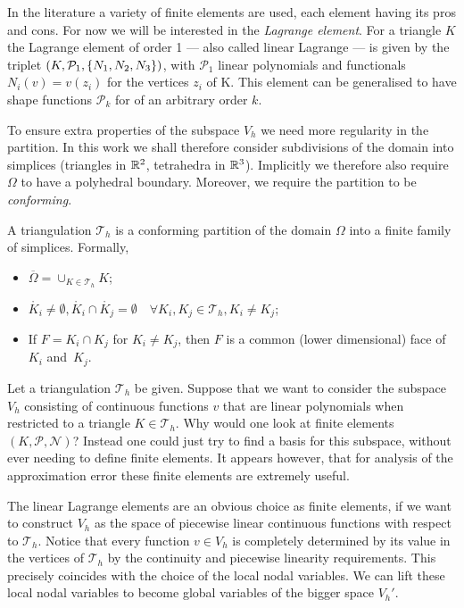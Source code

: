\documentclass[thesis.tex]{subfiles}
\begin{document}
  In the literature a variety of finite elements are used, each element having its pros and cons. For now we will be interested in the \emph{Lagrange element}. For a triangle $K$ the Lagrange element of order 1 --- also called linear Lagrange --- is given by the triplet $(K, \mathcal{P}_1, \set{N_1, N_2, N_3})$, with $\mathcal{P}_1$ linear polynomials and functionals $N_i(v) = v(z_i)$ for the vertices $z_i$ of K. This element can be generalised to have shape functions $\mathcal{P}_k$ for of an arbitrary order $k$.

  To ensure extra properties of the subspace $V_h$ we need more regularity in the partition. In this work  we shall therefore consider subdivisions of the domain into simplices (triangles in $\mathbb{R}^2$, tetrahedra in $\mathbb{R}^3$). Implicitly we therefore also require $\Omega$ to have a polyhedral boundary. Moreover, we require the partition to be \emph{conforming}.
  \begin{defn}
    A triangulation $\mathcal{T}_h$ is a conforming partition of the domain $\Omega$ into a finite family of simplices.
    Formally,
    \begin{itemize}
      \item $\overline{\Omega} = \cup_{K \in \mathcal{T}_h} K$;
      \item $\mathring{K_i} \ne \emptyset, \mathring{K_i} \cap \mathring{K_j} = \emptyset \quad \forall K_i, K_j \in \mathcal{T}_h, K_i \ne K_j$;
    \item If $F = K_i \cap K_j$ for $K_i \ne K_j$, then $F$ is a common (lower dimensional) face of $K_i$ and~$K_j$.
  \end{itemize}
  \end{defn}
  
  Let a triangulation $\mathcal{T}_h$ be given. Suppose that we want to consider the subspace $V_h$ consisting
  of continuous functions $v$ that are linear polynomials when restricted to a triangle $K \in \mathcal{T}_h$. Why
  would one look at finite elements $(K, \mathcal{P}, \mathcal{N})$? 
  Instead one could just try to find a basis for this subspace, without ever needing to define finite elements.
  It appears however, that for analysis of the approximation error these finite elements are extremely useful.

  The linear Lagrange elements are an obvious choice as finite elements, if we want to construct $V_h$ as the space
  of piecewise linear continuous functions with respect to $\mathcal{T}_h$. Notice that every function $v \in V_h$ is completely
  determined by its value in the vertices of $\mathcal{T}_h$ by the continuity and piecewise linearity requirements.
  This precisely coincides with the choice of the local nodal variables. We can lift these local nodal variables to become
  global variables of the bigger space $V_h'$.
  
\end{document}

